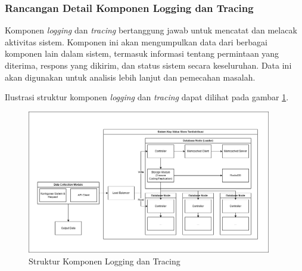 \subsubsection{Rancangan Detail Komponen Logging dan Tracing}
\label{subsubsection:detail-data-logging-tracing}

Komponen \textit{logging} dan \textit{tracing} bertanggung jawab untuk mencatat dan melacak aktivitas sistem. Komponen ini akan mengumpulkan data dari berbagai komponen lain dalam sistem, termasuk informasi tentang permintaan yang diterima, respons yang dikirim, dan status sistem secara keseluruhan. Data ini akan digunakan untuk analisis lebih lanjut dan pemecahan masalah.

Ilustrasi struktur komponen \textit{logging} dan \textit{tracing} dapat dilihat pada gambar \ref{fig:logging-tracing-structure}.

\begin{figure}[ht]
    \centering
    \includegraphics[width=0.95\textwidth]{resources/chapter-3/general-architecture.png}
    \caption{Struktur Komponen Logging dan Tracing}
    \label{fig:logging-tracing-structure}
\end{figure}
